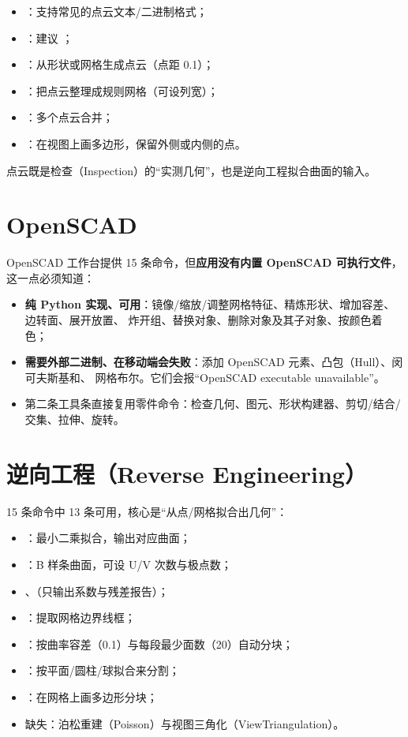 \begin{itemize}
  \item {}：支持常见的点云文本/二进制格式；
  \item {}：建议 ；
  \item {}：从形状或网格生成点云（点距 0.1）；
  \item {}：把点云整理成规则网格（可设列宽）；
  \item {}：多个点云合并；
  \item {}：在视图上画多边形，保留外侧或内侧的点。
\end{itemize}

点云既是检查（Inspection）的“实测几何”，也是逆向工程拟合曲面的输入。

\section{OpenSCAD}

OpenSCAD 工作台提供 15 条命令，但\textbf{应用没有内置 OpenSCAD 可执行文件}，这一点必须知道：

\begin{itemize}
  \item \textbf{纯 Python 实现、可用}：镜像/缩放/调整网格特征、精炼形状、增加容差、边转面、展开放置、
        炸开组、替换对象、删除对象及其子对象、按颜色着色；
  \item \textbf{需要外部二进制、在移动端会失败}：添加 OpenSCAD 元素、凸包（Hull）、闵可夫斯基和、
        网格布尔。它们会报“OpenSCAD executable unavailable”。
  \item 第二条工具条直接复用零件命令：检查几何、图元、形状构建器、剪切/结合/交集、拉伸、旋转。
\end{itemize}

\section{逆向工程（Reverse Engineering）}

15 条命令中 13 条可用，核心是“从点/网格拟合出几何”：

\begin{itemize}
  \item {}：最小二乘拟合，输出对应曲面；
  \item {}：B 样条曲面，可设 U/V 次数与极点数；
  \item {}、（只输出系数与残差报告）；
  \item {}：提取网格边界线框；
  \item {}：按曲率容差（0.1）与每段最少面数（20）自动分块；
  \item {}：按平面/圆柱/球拟合来分割；
  \item {}：在网格上画多边形分块；
  \item 缺失：泊松重建（Poisson）与视图三角化（ViewTriangulation）。
\end{itemize}

